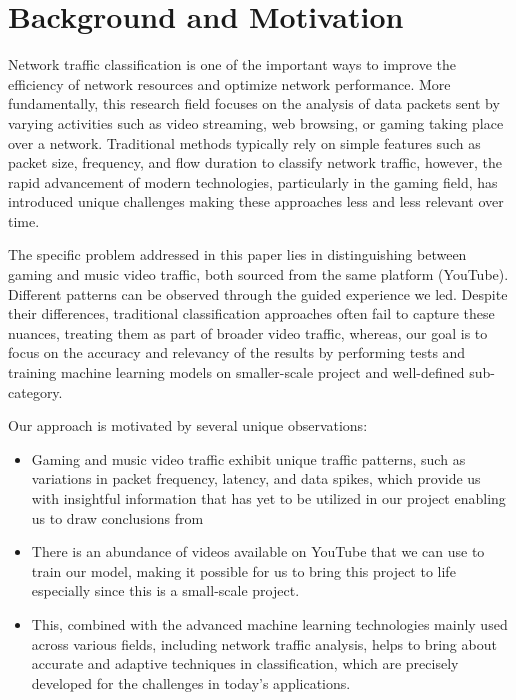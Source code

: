 \section{Background and Motivation}
\label{sec:background}





Network traffic classification is one of the important ways to improve the efficiency of network resources and optimize network performance. More fundamentally, this research field focuses on the analysis of data packets sent by varying activities such as video streaming, web browsing, or gaming taking place over a network. Traditional methods typically rely on simple features such as packet size, frequency, and flow duration to classify network traffic, however, the rapid advancement of modern technologies, particularly in the gaming field, has introduced unique challenges making these approaches less and less relevant over time.

\vspace{2mm}

The specific problem addressed in this paper lies in distinguishing between gaming and music video traffic, both sourced from the same platform (YouTube). Different patterns can be observed through the guided experience we led. Despite their differences, traditional classification approaches often fail to capture these nuances, treating them as part of broader video traffic, whereas, our goal is to focus on the accuracy and relevancy of the results by performing tests and training machine learning models on smaller-scale project and well-defined sub-category.

Our approach is motivated by several unique observations:
\begin{itemize}
    \item Gaming and music video traffic exhibit unique traffic patterns, such as variations in packet frequency, latency, and data spikes, which provide us with insightful information that has yet to be utilized in our project enabling us to draw conclusions from
    \item There is an abundance of videos available on YouTube that we can use to train our model, making it possible for us to bring this project to life especially since this is a small-scale project.
    \item This, combined with the advanced machine learning technologies mainly used across various fields, including network traffic analysis, helps to bring about accurate and adaptive techniques in classification, which are precisely developed for the challenges in today's applications.
\end{itemize}

